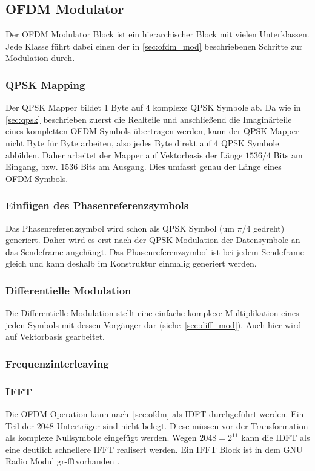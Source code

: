 \subsection{OFDM Modulator}
Der OFDM Modulator Block ist ein hierarchischer Block mit vielen Unterklassen. Jede Klasse führt dabei einen der in \ref{sec:ofdm_mod} beschriebenen Schritte zur Modulation durch.

\subsubsection{QPSK Mapping}
Der QPSK Mapper bildet 1 Byte auf 4 komplexe QPSK Symbole ab. Da wie in \ref{sec:qpsk} beschrieben zuerst die Realteile und anschließend die Imaginärteile eines kompletten OFDM Symbols übertragen werden, kann der QPSK Mapper nicht Byte für Byte arbeiten, also jedes Byte direkt auf 4 QPSK Symbole abbilden. Daher arbeitet der Mapper auf Vektorbasis der Länge $1536/4$ Bits am Eingang, bzw. $1536$ Bits am Ausgang. Dies umfasst genau der Länge eines OFDM Symbols.

\subsubsection{Einfügen des Phasenreferenzsymbols}
Das Phasenreferenzsymbol wird schon als QPSK Symbol (um $\pi/4$ gedreht) generiert. Daher wird es erst nach der QPSK Modulation der Datensymbole an das Sendeframe angehängt. Das Phasenreferenzsymbol ist bei jedem Sendeframe gleich und kann deshalb im Konstruktur einmalig generiert werden.
\subsubsection{Differentielle Modulation}
Die Differentielle Modulation stellt eine einfache komplexe Multiplikation eines jeden Symbols mit dessen Vorgänger dar (siehe~\ref{sec:diff_mod}). Auch hier wird auf Vektorbasis gearbeitet.

\subsubsection{Frequenzinterleaving}

\subsubsection{\ac{IFFT}}
Die OFDM Operation kann nach~\ref{sec:ofdm} als \ac{IDFT} durchgeführt werden. Ein Teil der 2048 Unterträger sind nicht belegt. Diese müssen vor der Transformation als komplexe Nullsymbole eingefügt werden. Wegen $2048 = 2^{11}$ kann die IDFT als eine deutlich schnellere IFFT realisert werden. Ein IFFT Block ist in dem GNU Radio Modul \dq gr-fft\dq vorhanden \cite{repo:gr-fft}.

